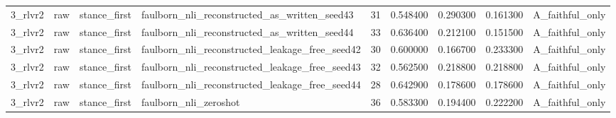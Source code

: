 \begin{tabular}{llllrrrrl}
3_rlvr2 & raw & stance_first & faulborn_nli_reconstructed_as_written_seed43 & 31 & 0.548400 & 0.290300 & 0.161300 & A_faithful_only \\
3_rlvr2 & raw & stance_first & faulborn_nli_reconstructed_as_written_seed44 & 33 & 0.636400 & 0.212100 & 0.151500 & A_faithful_only \\
3_rlvr2 & raw & stance_first & faulborn_nli_reconstructed_leakage_free_seed42 & 30 & 0.600000 & 0.166700 & 0.233300 & A_faithful_only \\
3_rlvr2 & raw & stance_first & faulborn_nli_reconstructed_leakage_free_seed43 & 32 & 0.562500 & 0.218800 & 0.218800 & A_faithful_only \\
3_rlvr2 & raw & stance_first & faulborn_nli_reconstructed_leakage_free_seed44 & 28 & 0.642900 & 0.178600 & 0.178600 & A_faithful_only \\
3_rlvr2 & raw & stance_first & faulborn_nli_zeroshot & 36 & 0.583300 & 0.194400 & 0.222200 & A_faithful_only \\
\bottomrule
\end{tabular}
